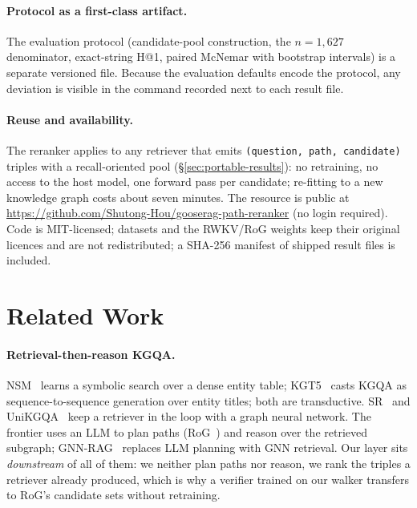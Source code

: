 \documentclass[sigconf,review]{acmart}
\begin{document}
\paragraph{Protocol as a first-class artifact.} The evaluation protocol (candidate-pool construction, the $n=1{,}627$ denominator, exact-string H@1, paired McNemar with bootstrap intervals) is a separate versioned file. Because the evaluation defaults encode the protocol, any deviation is visible in the command recorded next to each result file.

\paragraph{Reuse and availability.} The reranker applies to any retriever that emits \texttt{(question, path, candidate)} triples with a recall-oriented pool (\S\ref{sec:portable-results}): no retraining, no access to the host model, one forward pass per candidate; re-fitting to a new knowledge graph costs about seven minutes. The resource is public at \url{https://github.com/Shutong-Hou/gooserag-path-reranker} (no login required). Code is MIT-licensed; datasets and the RWKV/RoG weights keep their original licences and are not redistributed; a SHA-256 manifest of shipped result files is included.

\section{Related Work}
\label{sec:related}

\paragraph{Retrieval-then-reason KGQA.}
NSM~\cite{he2021nsm} learns a symbolic search over a dense entity table; KGT5~\cite{saxena2022kgt5} casts KGQA as sequence-to-sequence generation over entity titles; both are transductive. SR~\cite{zhang2022sr} and UniKGQA~\cite{jiang2023unikgqa} keep a retriever in the loop with a graph neural network. The frontier uses an LLM to plan paths (RoG~\cite{luo2024rog}) and reason over the retrieved subgraph; GNN-RAG~\cite{mavromatis2024gnnrag} replaces LLM planning with GNN retrieval. Our layer sits \emph{downstream} of all of them: we neither plan paths nor reason, we rank the triples a retriever already produced, which is why a verifier trained on our walker transfers to RoG's candidate sets without retraining.
\end{document}
